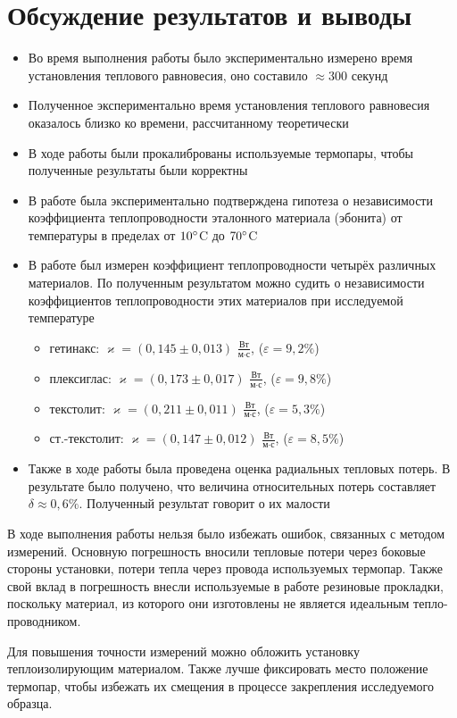 \documentclass[a4paper,12pt]{article} %
\begin{document}
\section{Обсуждение результатов и выводы}

\begin{itemize}
	\item Во время выполнения работы было экспериментально измерено время установления теплового равновесия, оно составило $ \approx 300 $ секунд
	\item Полученное экспериментально время установления теплового равновесия оказалось близко ко времени, рассчитанному теоретически
	\item В ходе работы были прокалиброваны используемые термопары, чтобы полученные результаты были корректны
	\item В работе была экспериментально подтверждена гипотеза о независимости коэффициента теплопроводности эталонного материала (эбонита) от температуры в пределах от $ 10\degree $C до $ 70\degree $C
	\item В работе был измерен коэффициент теплопроводности четырёх различных материалов. По полученным результатом можно судить о независимости коэффициентов теплопроводности этих материалов при исследуемой температуре
	\begin{itemize}
		\item гетинакс: $ \varkappa = (0,145 \pm 0,013) $ $ \frac{\text{Вт}}{\text{м} \cdot \text{с}} $, ($\varepsilon = 9,2\%$)
		\item плексиглас: $ \varkappa = (0,173 \pm 0,017) $ $ \frac{\text{Вт}}{\text{м} \cdot \text{с}} $, ($\varepsilon = 9,8\%$)
		\item текстолит: $ \varkappa = (0,211 \pm 0,011) $ $ \frac{\text{Вт}}{\text{м} \cdot \text{с}} $, ($\varepsilon = 5,3\%$)
		\item ст.-текстолит: $ \varkappa = (0,147 \pm 0,012) $ $ \frac{\text{Вт}}{\text{м} \cdot \text{с}} $, ($\varepsilon = 8,5\%$)
	\end{itemize}
	\item Также в ходе работы была проведена оценка радиальных тепловых потерь. В результате было получено, что величина относительных потерь составляет $ \delta \approx 0,6\% $. Полученный результат говорит о их малости
\end{itemize}

В ходе выполнения работы нельзя было избежать ошибок, связанных с методом измерений. Основную погрешность вносили тепловые потери через боковые стороны установки, потери тепла через провода используемых термопар. Также свой вклад в погрешность внесли используемые в работе резиновые прокладки, поскольку материал, из которого они изготовлены не является идеальным тепло-проводником.

Для повышения точности измерений можно обложить установку теплоизолирующим материалом. Также лучше фиксировать место положение термопар, чтобы избежать их смещения в процессе закрепления исследуемого образца.
\end{document}
